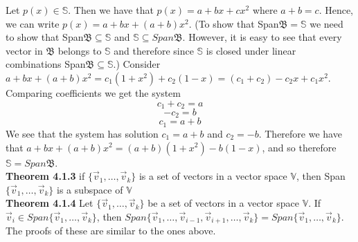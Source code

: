 \documentclass[10pt,letter]{article}
\begin{document}
Let $p(x)\in\mathbb{S}$. Then we have that $p(x)=a+bx+cx^2$ where $a+b=c$. Hence, we can write $p(x)=a+bx+(a+b)x^2$. (To show that Span$\mathfrak{B}=\mathbb{S}$ we need to show that Span$\mathfrak{B}\subseteq\mathbb{S}$ and $\mathbb{S}\subseteq Span\mathfrak{B}$. However, it is easy to see that every vector in $\mathfrak{B}$ belongs to $\mathbb{S}$ and therefore since $\mathbb{S}$ is closed under linear combinations Span$\mathfrak{B}\subseteq\mathbb{S}$.) Consider $a+bx+(a+b)x^2=c_1(1+x^2)+c_2(1-x)=(c_1+c_2)-c_2x+c_1x^2$. Comparing coefficients we get the system $$c_1+c_2=a$$ $$-c_2=b$$ $$c_1=a+b$$ We see that the system has solution $c_1=a+b$ and $c_2=-b$. Therefore we have that $a+bx+(a+b)x^2=(a+b)(1+x^2)-b(1-x)$, and so therefore $\mathbb{S}=Span\mathfrak{B}$. \\ 
\textbf{Theorem 4.1.3} if $\{\vec{v}_1,\ldots,\vec{v}_k\}$ is a set of vectors in a vector space $\mathbb{V}$, then Span$\{\vec{v}_1,\ldots,\vec{v}_k\}$ is a subspace of $\mathbb{V}$ \\ 
\textbf{Theorem 4.1.4} Let $\{\vec{v}_1,\ldots,\vec{v}_k\}$ be a set of vectors in a vector space $\mathbb{V}$. If $\vec{v}_i\in Span\{\vec{v}_1,\ldots,\vec{v}_k\}$, then $Span\{\vec{v}_1,\ldots,\vec{v}_{i-1},\vec{v}_{i+1},\ldots,\vec{v}_k\}=Span\{\vec{v}_1,\ldots,\vec{v}_k\}$. The proofs of these are similar to the ones above. 
\end{document}
